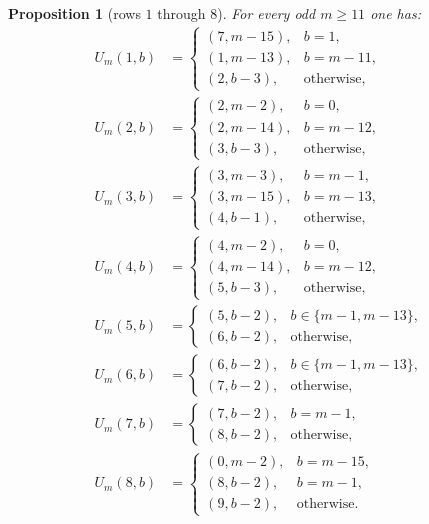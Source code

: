 \documentclass[11pt]{article}
\newtheorem{proposition}[theorem]{Proposition}
\newcommand{\1}{\mathbf 1}
\begin{document}
\begin{proposition}[rows $1$ through $8$]\label{prop:rows1to8}
For every odd $m\ge 11$ one has:
\begin{align*}
U_m(1,b)&=
\begin{cases}
(7,m-15), & b=1,\\
(1,m-13), & b=m-11,\\
(2,b-3), & \text{otherwise,}
\end{cases}\\[0.5ex]
U_m(2,b)&=
\begin{cases}
(2,m-2), & b=0,\\
(2,m-14), & b=m-12,\\
(3,b-3), & \text{otherwise,}
\end{cases}\\[0.5ex]
U_m(3,b)&=
\begin{cases}
(3,m-3), & b=m-1,\\
(3,m-15), & b=m-13,\\
(4,b-1), & \text{otherwise,}
\end{cases}\\[0.5ex]
U_m(4,b)&=
\begin{cases}
(4,m-2), & b=0,\\
(4,m-14), & b=m-12,\\
(5,b-3), & \text{otherwise,}
\end{cases}\\[0.5ex]
U_m(5,b)&=
\begin{cases}
(5,b-2), & b\in\{m-1,m-13\},\\
(6,b-2), & \text{otherwise,}
\end{cases}\\[0.5ex]
U_m(6,b)&=
\begin{cases}
(6,b-2), & b\in\{m-1,m-13\},\\
(7,b-2), & \text{otherwise,}
\end{cases}\\[0.5ex]
U_m(7,b)&=
\begin{cases}
(7,b-2), & b=m-1,\\
(8,b-2), & \text{otherwise,}
\end{cases}\\[0.5ex]
U_m(8,b)&=
\begin{cases}
(0,m-2), & b=m-15,\\
(8,b-2), & b=m-1,\\
(9,b-2), & \text{otherwise.}
\end{cases}
\end{align*}
\end{proposition}
\end{document}
